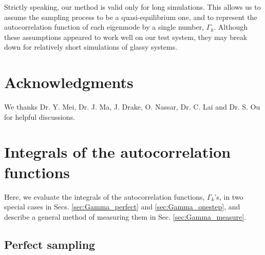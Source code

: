 \documentclass[reprint, floatfix]{revtex4-1}
\begin{document}
Strictly speaking, our method is valid
only for long simulations.
%
This allows us to assume the sampling process
to be a quasi-equilibrium one,
and to represent the autocorrelation function
of each eigenmode by a single number, $\Gamma_k$.
%
Although these assumptions appeared to work well
on our test system,
they may break down for relatively short simulations
of glassy systems.



\section{Acknowledgments}

We thanks
Dr. Y. Mei, Dr. J. Ma,
J. Drake, O. Nassar, Dr. C. Lai and Dr. S. Ou
for helpful discussions.


\appendix


\section{\label{sec:Gamma}
Integrals of the autocorrelation functions}



Here, we evaluate the integrals of
the autocorrelation functions,
$\Gamma_k$'s,
in two special cases
in Secs. \ref{sec:Gamma_perfect}
and \ref{sec:Gamma_onestep},
and describe a general method of measuring them
in Sec. \ref{sec:Gamma_measure}.



\subsection{\label{sec:Gamma_perfect}
Perfect sampling}
\end{document}
